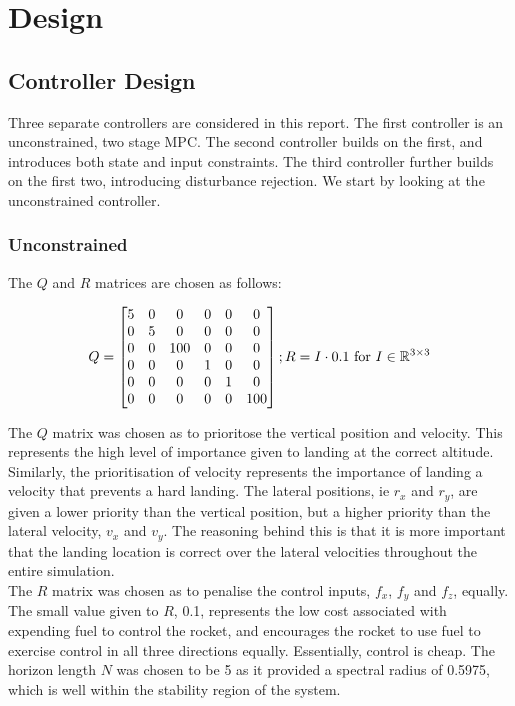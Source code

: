 \documentclass[conference, tikz]{IEEEtran}
\begin{document}
\section{Design}
\subsection{Controller Design}
Three separate controllers are considered in this report. 
The first controller is an unconstrained, two stage MPC. The second controller builds on the first, and introduces both state and input constraints. The third controller further builds on the first two, introducing disturbance rejection.
We start by looking at the unconstrained controller.
\subsubsection{Unconstrained}
The $Q$ and $R$ matrices are chosen as follows:

\[
    Q = \begin{bmatrix}
        5&0&0&0&0&0 \\
        0&5&0&0&0&0 \\
        0&0&100&0&0&0 \\
        0&0&0&1&0&0 \\
        0&0&0&0&1&0 \\
        0&0&0&0&0&100 \\
    \end{bmatrix}
    ;\\ R = I \cdot 0.1 \text{ for }  I \in \mathbb{R}^{3\times 3}
\]

The $Q$ matrix was chosen as to prioritose the vertical position and velocity.
This represents the high level of importance given to landing at the correct altitude. 
Similarly, the prioritisation of velocity represents the importance of landing a velocity that prevents a hard landing.
The lateral positions, ie $r_x$ and $r_y$, are given a lower priority than the vertical position, but a higher priority than the lateral velocity, $v_x$ and $v_y$.
The reasoning behind this is that it is more important that the landing location is correct over the lateral velocities throughout the entire simulation. \\
The $R$ matrix was chosen as to penalise the control inputs, $f_x$, $f_y$ and $f_z$, equally.
The small value given to $R$, 0.1, represents the low cost associated with expending fuel to control the rocket, and encourages the rocket to use fuel to exercise control in all three directions equally. Essentially, control is cheap. 
The horizon length $N$ was chosen to be 5 as it provided a spectral radius of 0.5975, which is well within the stability region of the system.
\end{document}
